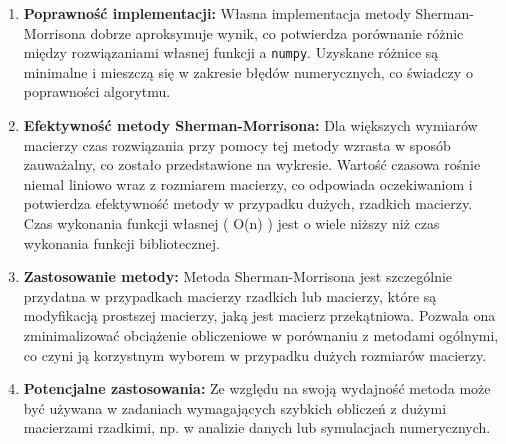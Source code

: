 \documentclass[a4paper,12pt]{article}
\begin{document}
\normalsize 
\begin{enumerate}
    \item \textbf{Poprawność implementacji:} Własna implementacja metody Sherman-Morrisona dobrze aproksymuje wynik, co potwierdza porównanie różnic między rozwiązaniami własnej funkcji a \texttt{numpy}. Uzyskane różnice są minimalne i mieszczą się w zakresie błędów numerycznych, co świadczy o poprawności algorytmu.

    \item \textbf{Efektywność metody Sherman-Morrisona:} Dla większych wymiarów macierzy czas rozwiązania przy pomocy tej metody wzrasta w sposób zauważalny, co zostało przedstawione na wykresie. Wartość czasowa rośnie niemal liniowo wraz z rozmiarem macierzy, co odpowiada oczekiwaniom i potwierdza efektywność metody w przypadku dużych, rzadkich macierzy. Czas wykonania funkcji własnej ( O(n) ) jest o wiele niższy niż czas wykonania funkcji bibliotecznej.

    \item \textbf{Zastosowanie metody:} Metoda Sherman-Morrisona jest szczególnie przydatna w przypadkach macierzy rzadkich lub macierzy, które są modyfikacją prostszej macierzy, jaką jest macierz przekątniowa. Pozwala ona zminimalizować obciążenie obliczeniowe w porównaniu z metodami ogólnymi, co czyni ją korzystnym wyborem w przypadku dużych rozmiarów macierzy.

    \item \textbf{Potencjalne zastosowania:} Ze względu na swoją wydajność metoda może być używana w zadaniach wymagających szybkich obliczeń z dużymi macierzami rzadkimi, np. w analizie danych lub symulacjach numerycznych.
\end{enumerate}
\end{document}
